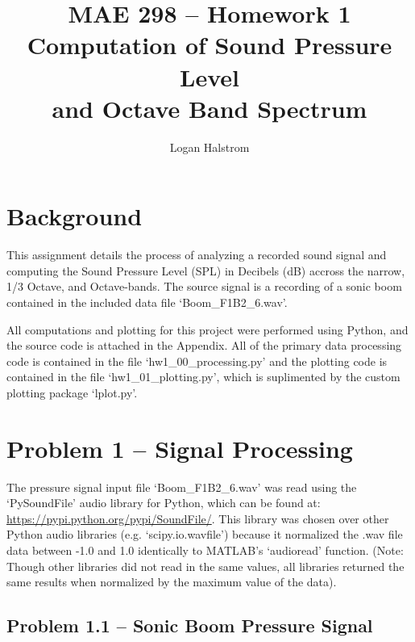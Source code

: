 \documentclass[twocolumn,10pt]{asme2ej}
\title{MAE 298 -- Homework 1\\Computation of Sound Pressure Level\\and Octave Band Spectrum}
\author{Logan Halstrom
    \affiliation{
	PhD Graduate Student Researcher\\
	Center for Human/Robot/Vehicle Integration and Performance\\
	Department of Mechanical and Aerospace Engineering\\
	University of California, Davis\\
    Email: ldhalstrom@ucdavis.edu
    }
}
\newcommand\linkcolor{blue} %
\begin{document}
\maketitle


\newcommand\pictype{png}  %
\newcommand\picdir{../Plots} %



\section{Background}

This assignment details the process of analyzing a recorded sound signal and computing the Sound Pressure Level (SPL) in Decibels (dB) accross the narrow, 1/3 Octave, and Octave-bands.  The source signal is a recording of a sonic boom contained in the included data file `Boom\_F1B2\_6.wav'.

All computations and plotting for this project were performed using Python, and the source code is attached in the Appendix.  All of the primary data processing code is contained in the file `hw1\_00\_processing.py' and the plotting code is contained in the file `hw1\_01\_plotting.py', which is suplimented by the custom plotting package `lplot.py'.

\section{Problem 1 -- Signal Processing}

The pressure signal input file `Boom\_F1B2\_6.wav' was read using the `PySoundFile' audio library for Python, which can be found at: \textcolor{\linkcolor}{\url{https://pypi.python.org/pypi/SoundFile/}}.  This library was chosen over other Python audio libraries (e.g. `scipy.io.wavfile') because it normalized the .wav file data between -1.0 and 1.0 identically to MATLAB's `audioread' function.  (Note: Though other libraries did not read in the same values, all libraries returned the same results when normalized by the maximum value of the data).


\subsection{Problem 1.1 -- Sonic Boom Pressure Signal}
\end{document}
